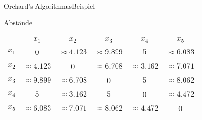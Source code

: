\documentclass{beamer}
\begin{document}
\begin{frame}{Orchard’s Algorithmus}{Beispiel}
  \begin{block}{Abst\"ande}
  \begin{center}
    \begin{tabular}{r|ccccc}
      & $x_1$ & $x_2$ & $x_3$ & $x_4$ & $x_5$\\
      \hline
      $x_1$ & 0 & $\approx 4.123$ & $\approx 9.899$ & $5$ & $\approx 6.083$\\
      $x_2$ & $\approx 4.123$ & 0 & $\approx 6.708$ & $\approx 3.162$ & $\approx 7.071$\\
      $x_3$ & $\approx 9.899$ & $\approx 6.708$ & 0 & $5$ & $\approx 8.062$\\
      $x_4$ & $5$ & $\approx 3.162$ & $5$ & 0 & $\approx 4.472$\\
      $x_5$ & $\approx 6.083$ & $\approx 7.071$ & $\approx 8.062$ & $\approx 4.472$ & 0\\
    \end{tabular}
  \end{center}
  \end{block}
\end{frame}
\end{document}
